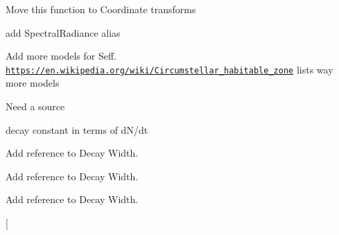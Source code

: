 
\begin{DoxyRefList}
\item[\label{todo__todo000009}%
\Hypertarget{todo__todo000009}%
Member \mbox{\hyperlink{group___e_g_x_math-_conversions-_coordinate_conversions-3_d-_spherical_gaa9b50c4837e1cbea569de6f7bc90a3b6}{E\+G\+X\+Math\+:\+:Spherical\+Cordinates\+Of\+Point\+Given\+Center}} (const T centerR, const T center\+Azimuth\+In\+Radians, const T center\+Zenith\+In\+Radians, const T pointR, const T point\+Azimuth\+In\+Radians, const T poin\+Zenith\+In\+Radians, T \&shiftedR, T \&shifted\+Azimuth\+In\+Radians, T \&shifted\+Zenith\+In\+Radians)]Move this function to Coordinate transforms  
\item[\label{todo__todo000011}%
\Hypertarget{todo__todo000011}%
Namespace \mbox{\hyperlink{namespace_e_g_x_phys}{E\+G\+X\+Phys}} ]add Spectral\+Radiance alias  
\item[\label{todo__todo000003}%
\Hypertarget{todo__todo000003}%
Module \mbox{\hyperlink{group___e_g_x_phys-_circumstellar_habitable_zone_limit}{E\+G\+X\+Phys-\/\+Circumstellar\+Habitable\+Zone\+Limit}} ]Add more models for Seff. \href{https://en.wikipedia.org/wiki/Circumstellar_habitable_zone}{\tt https\+://en.\+wikipedia.\+org/wiki/\+Circumstellar\+\_\+habitable\+\_\+zone} lists way more models  
\item[\label{todo__todo000002}%
\Hypertarget{todo__todo000002}%
Module \mbox{\hyperlink{group___e_g_x_phys-_constants-_astrophysics-_solar_system-_earth-_orbit}{E\+G\+X\+Phys-\/\+Constants-\/\+Astrophysics-\/\+Solar\+System-\/\+Earth-\/\+Orbit}} ]Need a source  
\item[\label{todo__todo000004}%
\Hypertarget{todo__todo000004}%
Module \mbox{\hyperlink{group___e_g_x_phys-_decay_constant}{E\+G\+X\+Phys-\/\+Decay\+Constant}} ]decay constant in terms of d\+N/dt  
\item[\label{todo__todo000005}%
\Hypertarget{todo__todo000005}%
Module \mbox{\hyperlink{group___e_g_x_phys-_half_life}{E\+G\+X\+Phys-\/\+Half\+Life}} ]Add reference to Decay Width.  
\item[\label{todo__todo000006}%
\Hypertarget{todo__todo000006}%
Module \mbox{\hyperlink{group___e_g_x_phys-_nuclear_binding_energy}{E\+G\+X\+Phys-\/\+Nuclear\+Binding\+Energy}} ]Add reference to Decay Width.  
\item[\label{todo__todo000008}%
\Hypertarget{todo__todo000008}%
Module \mbox{\hyperlink{group___e_g_x_phys-_semi_empirical_mass_formula}{E\+G\+X\+Phys-\/\+Semi\+Empirical\+Mass\+Formula}} ]Add reference to Decay Width.  
\item[\label{todo__todo000001}%

\end{DoxyRefList}
